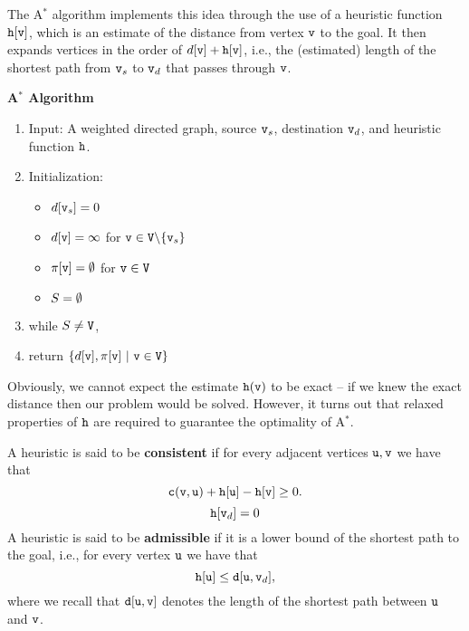 The A$^*$ algorithm implements this idea through the use of a heuristic function ${\tt h}[{\tt v}]$, which is an estimate of the distance from vertex ${\tt v}$ to the goal. It then expands vertices in the order of $d[{\tt v}] + {\tt h}[{\tt v}]$, i.e., the (estimated) length of the shortest path from ${\tt v}_s$ to ${\tt v}_d$ that passes through ${\tt v}$.

\begin{algorithm_}\textbf{A$^*$ Algorithm}
\begin{enumerate}
\item{Input:} A weighted directed graph, source ${\tt v}_s$, destination ${\tt v}_d$, and heuristic function ${\tt h}$.

\item Initialization:
\begin{itemize}
  \item[] $d[{\tt v}_s] = 0$
  \item[] $d[{\tt v}] = \infty $ for ${\tt v} \in {\tt V}\backslash \{ {\tt v}_s\} $
  \item[] $\pi [{\tt v}] = \emptyset $ for ${\tt v} \in {\tt V}$
  \item[] ${S} = \emptyset $
\end{itemize}

\item while ${S} \ne {\tt V}$,





\item return $\{ d[\nodev],\policy [\nodev] \ |\ \nodev \in \nodes\} $
\end{enumerate}
\end{algorithm_}

Obviously, we cannot expect the estimate ${\tt h}({\tt v})$ to be exact -- if we knew the exact distance then our problem would be solved. However, it turns out that relaxed properties of ${\tt h}$ are required to guarantee the optimality of A$^*$. 

\begin{definition}
A heuristic is said to be \textbf{consistent} if for every adjacent vertices ${\tt u},{\tt v}$ we have that $${\tt c}({\tt v},{\tt u})+{\tt h}[{\tt u}]-{\tt h}[{\tt v}] \geq 0.$$
$${\tt h}[{\tt v}_d]=0$$  
A heuristic is said to be \textbf{admissible} if it is a lower bound of the shortest path to the goal, i.e., for every vertex ${\tt u}$ we have that $${\tt h}[{\tt u}] \leq {\tt d}[{\tt u},{\tt v}_d],$$
where we recall that ${\tt d}[{\tt u},{\tt v}]$ denotes the length of the shortest path between ${\tt u}$ and ${\tt v}$.
\end{definition}

